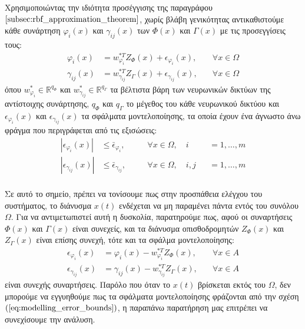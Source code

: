 Χρησιμοποιώντας την ιδιότητα προσέγγισης της παραγράφου $\ref{subsec:rbf_approximation_theorem}$, χωρίς βλάβη γενικότητας αντικαθιστούμε κάθε  συνάρτηση $\varphi_i(x)$ και $\gamma_{ij}(x)$ των $\varPhi(x)$ και $\Gamma(x)$ με τις προσεγγίσεις τους:
\begin{equation}
\begin{alignedat}{2}
	\varphi_i(x) &= w_{\varphi_i}^{*T} Z_{\varPhi}(x) + \epsilon_{\varphi_i}(x), \quad &\forall x \in \Omega \\
	\gamma_{ij}(x) &= w_{\gamma_{ij}}^{*T} Z_{\Gamma}(x) + \epsilon_{\gamma_{ij}}(x), \quad &\forall x \in \Omega
\end{alignedat}
\label{eq:rbf_approximations}
\end{equation}
όπου $w_{\varphi_i}^{*} \in \mathbb{R}^{q_{\varPhi}}$ και $w_{\gamma_{ij}}^{*} \in \mathbb{R}^{q_{\Gamma}}$ τα βέλτιστα βάρη των νευρωνικών δικτύων της αντίστοιχης συνάρτησης, $q_{\varPhi}$ και $q_{\Gamma}$ το μέγεθος του κάθε νευρωνικού δικτύου και $\epsilon_{\varphi_i}(x)$ και $\epsilon_{\gamma_{ij}}(x)$ τα σφάλματα μοντελοποίησης, τα οποία έχουν ένα άγνωστο άνω φράγμα που περιγράφεται από τις εξισώσεις:
\begin{equation}
\begin{alignedat}{3}
	| \epsilon_{\varphi_i}(x) | &\leq \bar{\epsilon}_{\varphi_i}, \quad &&\forall x \in \Omega, \quad  i&&= 1,\dots,m \\
	| \epsilon_{\gamma_{ij}}(x) | &\leq \bar{\epsilon}_{\gamma_{ij}}, \quad &&\forall x \in \Omega, \quad i,j &&= 1,\dots,m \\
	\end{alignedat}
	\label{eq:modelling_error_bounds}
\end{equation}

Σε αυτό το σημείο, πρέπει να τονίσουμε πως στην προσπάθεια ελέγχου του συστήματος, το διάνυσμα $x(t)$ ενδέχεται να μη παραμένει πάντα εντός του συνόλου $\Omega$. Για να αντιμετωπιστεί αυτή η δυσκολία, παρατηρούμε πως, αφού οι συναρτήσεις $\Phi(x)$ και $\Gamma(x)$ είναι συνεχείς, και τα διάνυσμα οπισθοδρομητών $Z_{\Phi}(x)$ και $Z_{\Gamma}(x)$ είναι επίσης συνεχή, τότε και τα σφάλμα μοντελοποίησης:
\begin{equation}
\begin{alignedat}{2}
\epsilon_{\varphi_i}(x) &= \varphi_i(x) - w_{\varphi_i}^{*T} Z_{\varPhi}(x) , \quad &\forall x \in A \\
\epsilon_{\gamma_{ij}}(x) &= \gamma_{ij}(x) - w_{\gamma_{ij}}^{*T} Z_{\Gamma}(x) , \quad &\forall x \in A
\end{alignedat}
\label{eq:modelling_error_continuity}
\end{equation}
είναι συνεχής συναρτήσεις. Παρόλο που όταν το $x(t)$ βρίσκεται εκτός του $\Omega$, δεν μπορούμε να εγγυηθούμε πως τα σφάλματα μοντελοποίησης φράζονται από την σχέση $(\ref{eq:modelling_error_bounds})$, η παραπάνω παρατήρηση μας επιτρέπει να συνεχίσουμε την ανάλυση.

